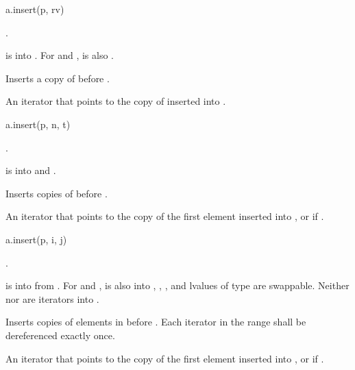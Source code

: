 \begin{itemdecl}
a.insert(p, rv)
\end{itemdecl}

\begin{itemdescr}
\pnum
\result
{}.

\pnum
\expects
{} is  into .
For  and ,
 is also .

\pnum
\effects
Inserts a copy of  before .

\pnum
\returns
An iterator that points to the copy of  inserted into .
\end{itemdescr}

\begin{itemdecl}
a.insert(p, n, t)
\end{itemdecl}

\begin{itemdescr}
\pnum
\result
{}.

\pnum
\expects
{} is  into 
and .

\pnum
\effects
Inserts  copies of  before .

\pnum
\returns
An iterator
that points to the copy of the first element inserted into , or
 if .
\end{itemdescr}

\begin{itemdecl}
a.insert(p, i, j)
\end{itemdecl}

\begin{itemdescr}
\pnum
\result
{}.

\pnum
\expects
{} is  into  from .
For  and ,
 is also
 into ,
,
, and
lvalues of type  are swappable.
Neither  nor  are iterators into .

\pnum
\effects
Inserts copies of elements in \tcode{[i, j)} before .
Each iterator in the range  shall be dereferenced exactly once.

\pnum
\returns
An iterator
that points to the copy of the first element inserted into , or
 if .
\end{itemdescr}

